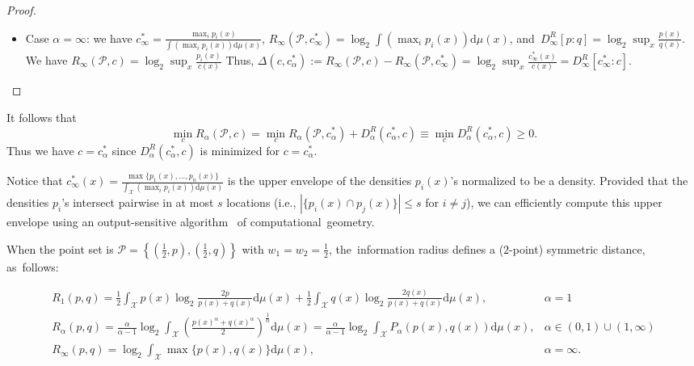 \documentclass[entropy,article,accept,oneauthor,pdftex,entropy]{Definitions/mdpi}
\def\dmu{\mathrm{d}\mu}
\def\calP{\mathcal{P}}
\def\calX{\mathcal{X}}
\def\dmu{\mathrm{d}\mu}
\begin{document}
\begin{paracol}{2}
\begin{proof}
\begin{itemize}
\item Case  $\alpha=\infty$: we have $c_\infty^*=\frac{\max_i p_i(x)}{\int (\max_i p_i(x))\dmu(x)}$,
  $R_\infty(\calP,c_\infty^*)=\log_2 \int (\max_i p_i(x))\dmu(x)$, and~$D_\infty^R[p:q]=\log_2 \sup_x \frac{p(x)}{q(x)}$.
	We have $R_\infty(\calP,c)=\log_2 \sup_x \frac{p_i(x)}{c(x)}$
	Thus, $\Delta(c,c^*_\alpha):=R_\infty(\calP,c) - R_\infty(\calP,c^*_\infty)=\log_2 \sup_x \frac{c_\infty^*(x)}{c(x)}=D_\infty^R[c^*_\infty:c]$.
	\end{itemize}
\end{proof}

It follows that
$$
\min_c R_\alpha(\calP,c)  = \min_c R_\alpha(\calP,c^*_\alpha)+D_\alpha^R(c^*_\alpha,c)\equiv \min_c D_\alpha^R(c^*_\alpha,c)\geq 0.
$$
Thus we have $c=c^*_\alpha$ since $D_\alpha^R(c^*_\alpha,c)$ is minimized for $c=c^*_\alpha$.

 

Notice that $c_\infty^*(x)= \frac{\max\{p_1(x),\ldots, p_n(x)\}}{\int_\calX (\max_i p_i(x))\dmu(x)}$ is the upper envelope of the densities $p_i(x)$'s normalized to be a density.
Provided that the densities $p_i$'s intersect pairwise in at most $s$ locations (i.e., $|\{p_i(x)\cap p_j(x)\}|\leq s$ for $i\not=j$), we can efficiently compute this upper envelope using an output-sensitive algorithm~\cite{Nielsen-1998} of computational~geometry.

When the point set is $\calP=\left\{\left(\frac{1}{2},p\right),\left(\frac{1}{2},q\right)\right\}$ with $w_1=w_2=\frac{1}{2}$, the~information radius defines a ($2$-point) symmetric distance, as~follows:
\end{paracol}
\nointerlineskip
$$
\begin{array}{ll}
R_1(p,q)= \frac{1}{2} \int_\calX p(x)\log_2\frac{2p}{p(x)+q(x)}\dmu(x) + \frac{1}{2} \int_\calX q(x)\log_2\frac{2q(x)}{p(x)+q(x)}\dmu(x), &   \alpha=1 \\
R_\alpha(p,q)=\frac{\alpha}{\alpha-1}\log_2 \int_\calX \left(\frac{ p(x)^\alpha+ q(x)^\alpha}{2}\right)^{\frac{1}{\alpha}} \dmu(x) 
=\frac{\alpha}{\alpha-1}\log_2 \int_\calX P_\alpha(p(x),q(x)) \dmu(x),
 & \alpha\in(0,1)\cup(1,\infty)\\
R_\infty(p,q)=\log_2 \int_\calX \max\{p(x),q(x)\} \dmu(x),& \alpha=\infty.
\end{array}
$$
\end{document}
